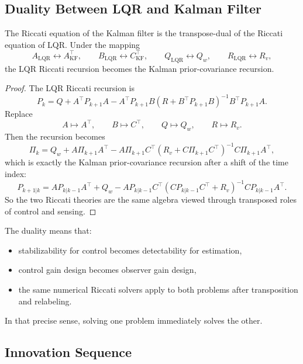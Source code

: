 \subsection{Duality Between LQR and Kalman Filter}
\label{sec:l7-duality-between-lqr-and-kalman-filter}

\begin{theorem}\label{thm:l7-lqr-kalman-duality}
	The Riccati equation of the Kalman filter is the transpose-dual of the Riccati equation of LQR. Under the mapping
	\[
		A_{\text{LQR}} \leftrightarrow A_{\text{KF}}^\top,
		\qquad
		B_{\text{LQR}} \leftrightarrow C_{\text{KF}}^\top,
		\qquad
		Q_{\text{LQR}} \leftrightarrow Q_w,
		\qquad
		R_{\text{LQR}} \leftrightarrow R_v,
	\]
	the LQR Riccati recursion becomes the Kalman prior-covariance recursion.
\end{theorem}
\begin{proof}
	The LQR Riccati recursion is
	\[
		P_k
		=
		Q + A^\top P_{k+1}A
		-
		A^\top P_{k+1}B(R+B^\top P_{k+1}B)^{-1}B^\top P_{k+1}A.
	\]
	Replace
	\[
		A \mapsto A^\top,
		\qquad
		B \mapsto C^\top,
		\qquad
		Q \mapsto Q_w,
		\qquad
		R \mapsto R_v.
	\]
	Then the recursion becomes
	\[
		\Pi_k
		=
		Q_w + A\Pi_{k+1}A^\top
		-
		A\Pi_{k+1}C^\top(R_v+C\Pi_{k+1}C^\top)^{-1}C\Pi_{k+1}A^\top,
	\]
	which is exactly the Kalman prior-covariance recursion after a shift of the time index:
	\[
		P_{k+1|k}
		=
		A P_{k|k-1}A^\top + Q_w
		-
		A P_{k|k-1}C^\top(CP_{k|k-1}C^\top+R_v)^{-1}CP_{k|k-1}A^\top.
	\]
	So the two Riccati theories are the same algebra viewed through transposed roles of control and sensing.
\end{proof}

\begin{remark}
	The duality means that:
	\begin{itemize}
		\item stabilizability for control becomes detectability for estimation,
		\item control gain design becomes observer gain design,
		\item the same numerical Riccati solvers apply to both problems after transposition and relabeling.
	\end{itemize}
	In that precise sense, solving one problem immediately solves the other.
\end{remark}

\subsection{Innovation Sequence}
\label{sec:l7-innovation-sequence}

